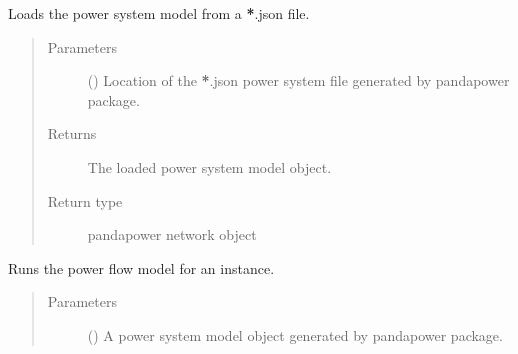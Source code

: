 \documentclass[letterpaper,10pt,english]{sphinxmanual}
\begin{document}
\begin{fulllineitems}
\label{\detokenize{apidoc:dreaminsg_integrated_model.src.network_sim_models.power.power_system_model.load_power_network}}
\sphinxAtStartPar
Loads the power system model from a {\color{red}\bfseries{}*}.json file.
\begin{quote}\begin{description}
\item[{Parameters}] \leavevmode
\sphinxAtStartPar
{} () \textendash{} Location of the {\color{red}\bfseries{}*}.json power system file generated by pandapower package.

\item[{Returns}] \leavevmode
\sphinxAtStartPar
The loaded power system model object.

\item[{Return type}] \leavevmode
\sphinxAtStartPar
pandapower network object

\end{description}\end{quote}

\end{fulllineitems}


\begin{fulllineitems}
\label{\detokenize{apidoc:dreaminsg_integrated_model.src.network_sim_models.power.power_system_model.run_power_simulation}}
\sphinxAtStartPar
Runs the power flow model for an instance.
\begin{quote}\begin{description}
\item[{Parameters}] \leavevmode
\sphinxAtStartPar
{} () \textendash{} A power system model object generated by pandapower package.

\end{description}\end{quote}

\end{fulllineitems}
\end{document}

